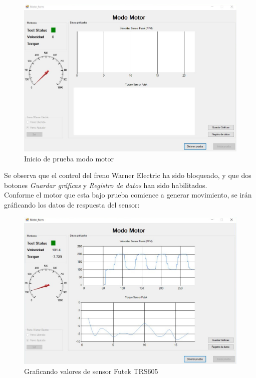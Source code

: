 \documentclass[12pt,titlepage]{article}
\begin{document}
\begin{figure}[htbp]
\hspace*{2.1cm} 
\includegraphics[scale=0.57]{init_test}
\caption{Inicio de prueba modo motor}
\end{figure}

Se observa que el control del freno Warner Electric ha sido bloqueado, y que dos botones \textit{Guardar gráficas} y \textit{Registro de datos} han sido habilitados. \\ 
\newpage
Conforme el motor que esta bajo prueba comience a generar movimiento, se irán gráficando los datos de respuesta del sensor: \\

\begin{figure}[htbp]
\hspace*{1.8cm} 
\includegraphics[scale=0.57]{test}
\caption{Graficando valores de sensor Futek TRS605}
\end{figure}
 
\end{document}
